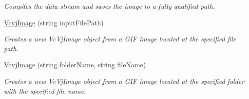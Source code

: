 \begin{DoxyCompactItemize}
\begin{DoxyCompactList}\small\item\em Compiles the data stream and saves the image to a fully qualified path. \end{DoxyCompactList}\item 
\hyperlink{classvcvj_1_1_vcvj_image_a5d9a5ea2928dd78e3c1899dc6a83732a}{Vcvj\+Image} (string input\+File\+Path)
\begin{DoxyCompactList}\small\item\em Creates a new Vc\+Vj\+Image object from a G\+IF image located at the specified file path. \end{DoxyCompactList}\item 
\hyperlink{classvcvj_1_1_vcvj_image_afdfa6f404bed3a3c0a0c9a16060206f8}{Vcvj\+Image} (string folder\+Name, string file\+Name)
\begin{DoxyCompactList}\small\item\em Creates a new Vc\+Vj\+Image object from a G\+IF image located at the specified folder with the specified file name. \end{DoxyCompactList}\end{DoxyCompactItemize}

